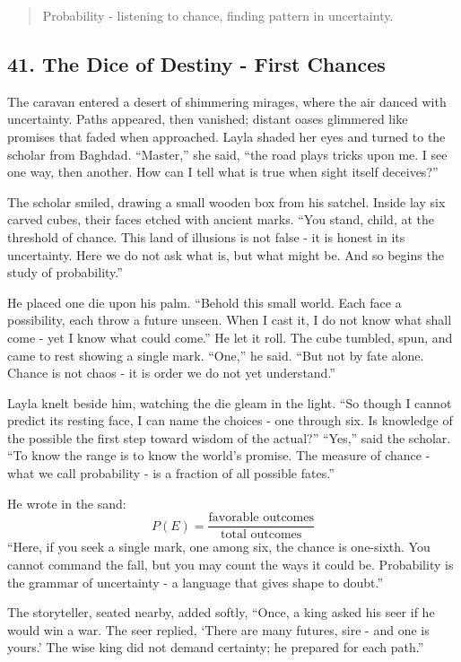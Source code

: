 \documentclass[
  letterpaper,
  DIV=11,
  numbers=noendperiod]{scrreprt}
\begin{document}
\begin{quote}
Probability - listening to chance, finding pattern in uncertainty.
\end{quote}

\subsection{41. The Dice of Destiny - First
Chances}\label{the-dice-of-destiny---first-chances}

The caravan entered a desert of shimmering mirages, where the air danced
with uncertainty. Paths appeared, then vanished; distant oases glimmered
like promises that faded when approached. Layla shaded her eyes and
turned to the scholar from Baghdad. ``Master,'' she said, ``the road
plays tricks upon me. I see one way, then another. How can I tell what
is true when sight itself deceives?''

The scholar smiled, drawing a small wooden box from his satchel. Inside
lay six carved cubes, their faces etched with ancient marks. ``You
stand, child, at the threshold of chance. This land of illusions is not
false - it is honest in its uncertainty. Here we do not ask what is, but
what might be. And so begins the study of probability.''

He placed one die upon his palm. ``Behold this small world. Each face a
possibility, each throw a future unseen. When I cast it, I do not know
what shall come - yet I know what could come.'' He let it roll. The cube
tumbled, spun, and came to rest showing a single mark. ``One,'' he said.
``But not by fate alone. Chance is not chaos - it is order we do not yet
understand.''

Layla knelt beside him, watching the die gleam in the light. ``So though
I cannot predict its resting face, I can name the choices - one through
six. Is knowledge of the possible the first step toward wisdom of the
actual?'' ``Yes,'' said the scholar. ``To know the range is to know the
world's promise. The measure of chance - what we call probability - is a
fraction of all possible fates.''

He wrote in the sand: \[
P(E) = \frac{\text{favorable outcomes}}{\text{total outcomes}}
\] ``Here, if you seek a single mark, one among six, the chance is
one-sixth. You cannot command the fall, but you may count the ways it
could be. Probability is the grammar of uncertainty - a language that
gives shape to doubt.''

The storyteller, seated nearby, added softly, ``Once, a king asked his
seer if he would win a war. The seer replied, `There are many futures,
sire - and one is yours.' The wise king did not demand certainty; he
prepared for each path.''
\end{document}
